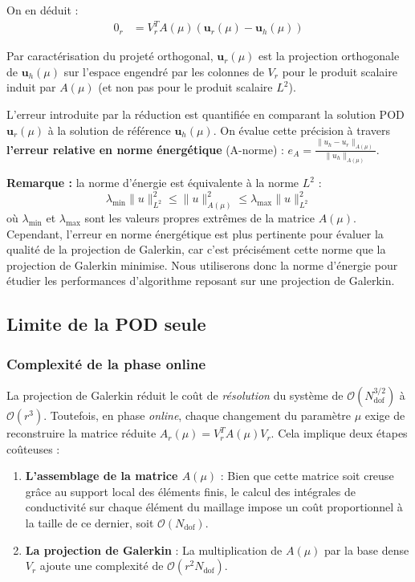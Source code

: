 \documentclass[12pt,a4paper]{article}
\begin{document}
On en déduit :
\begin{align}
    0_r &= V_r^T A(\mu) (\mathbf{u}_r(\mu) - \mathbf{u}_h(\mu))
\end{align}
 
Par caractérisation du projeté orthogonal, $\mathbf{u}_r(\mu)$ est la projection orthogonale de $\mathbf{u}_h(\mu)$ sur l'espace engendré par les colonnes de $V_r$ pour le produit scalaire induit par $A(\mu)$ (et non pas pour le produit scalaire $L^2$).
 
L'erreur introduite par la réduction est quantifiée en comparant la solution POD $\mathbf{u}_r(\mu)$ à la solution de référence $\mathbf{u}_h(\mu)$. On évalue cette précision à travers \textbf{l'erreur relative en norme énergétique} (A-norme) : $e_A = \frac{\|u_h - u_r\|_{A(\mu)}}{\|u_h\|_{A(\mu)}}$.

\textbf{Remarque :} la norme d'énergie est équivalente à la norme $L^2$ : 
\begin{equation*}
    \lambda_{\min} \|u\|_{L^2}^2 \leq \|u\|_{A(\mu)}^2 \leq \lambda_{\max} \|u\|_{L^2}^2
\end{equation*}
où $\lambda_{\min}$ et $\lambda_{\max}$ sont les valeurs propres extrêmes de la matrice $A(\mu)$. Cependant, l'erreur en norme énergétique est plus pertinente pour évaluer la qualité de la projection de Galerkin, car c'est précisément cette norme que la projection de Galerkin minimise. Nous utiliserons donc la norme d'énergie pour étudier les performances d'algorithme reposant sur une projection de Galerkin.


\subsection{Limite de la POD seule}
 
\subsubsection{Complexité de la phase online}

La projection de Galerkin réduit le coût de \textit{résolution} du système de $\mathcal{O}(N_{\text{dof}}^{3/2})$ à $\mathcal{O}(r^3)$. Toutefois, en phase \textit{online}, chaque changement du paramètre $\mu$ exige de reconstruire la matrice réduite $A_r(\mu) = V_r^T A(\mu) V_r$. Cela implique deux étapes coûteuses :

\begin{enumerate}
    \item \textbf{L'assemblage de la matrice $A(\mu)$} : Bien que cette matrice soit creuse grâce au support local des éléments finis, le calcul des intégrales de conductivité sur chaque élément du maillage impose un coût proportionnel à la taille de ce dernier, soit $\mathcal{O}(N_{\text{dof}})$.
    \item \textbf{La projection de Galerkin} : La multiplication de $A(\mu)$ par la base dense $V_r$ ajoute une complexité de $\mathcal{O}(r^2 N_{\text{dof}})$.
\end{enumerate}
\end{document}
